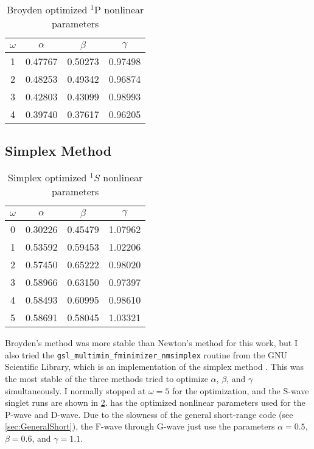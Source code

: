 \documentclass[Dissertation.tex]{subfiles}
\begin{document}
\begin{table}[H]
\centering
\begin{tabular}{c c c c}
\toprule
$\omega$ & $\alpha$ & $\beta$ & $\gamma$ \\ [0.5ex]
\midrule
1 & 0.47767 & 0.50273 & 0.97498 \\
2 & 0.48253 & 0.49342 & 0.96874 \\
3 & 0.42803 & 0.43099 & 0.98993 \\
4 & 0.39740 & 0.37617 & 0.96205 \\
\bottomrule
\end{tabular}
\caption{Broyden optimized $^1$P nonlinear parameters}
\label{tab:BroydenPWaveSingOpt}
\end{table}



\subsection{Simplex Method}
\label{sec:Simplex}

\begin{table}[H]
\centering
\begin{tabular}{c c c c}
\toprule
$\omega$ & $\alpha$ & $\beta$ & $\gamma$ \\ [0.5ex]
\midrule
0 & 0.30226 & 0.45479 & 1.07962 \\
1 & 0.53592 & 0.59453 & 1.02206 \\
2 & 0.57450 & 0.65222 & 0.98020 \\
3 & 0.58966 & 0.63150 & 0.97397 \\
4 & 0.58493 & 0.60995 & 0.98610 \\
5 & 0.58691 & 0.58045 & 1.03321 \\
\bottomrule
\end{tabular}
\caption{Simplex optimized $^1S$ nonlinear parameters}
\label{tab:NonlinearOptimized1SSimplex}
\end{table}

Broyden's method was more stable than Newton's method for this work, but I also tried the \texttt{gsl\_multimin\_fminimizer\_nmsimplex} routine from the GNU Scientific Library, which is an implementation of the simplex method \cite{GSL,GSLsimplex}. This was the most stable of the three methods tried to optimize $\alpha$, $\beta$, and $\gamma$ simultaneously. I normally stopped at $\omega = 5$ for the optimization, and the S-wave singlet runs are shown in \cref{tab:NonlinearOptimized1SSimplex}.  has the optimized nonlinear parameters used for the P-wave and D-wave. Due to the slowness of the general short-range code (see \cref{sec:GeneralShort}), the F-wave through G-wave just use the parameters $\alpha = 0.5$, $\beta = 0.6$, and $\gamma = 1.1$.
\end{document}
